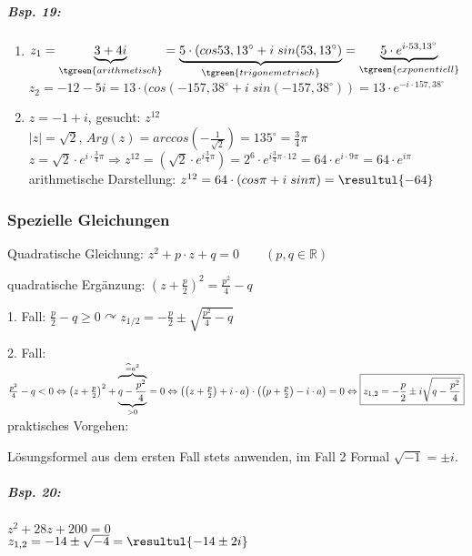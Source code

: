 \subparagraph{Bsp. 19:}
\begin{enumerate}
[label=\alph*.)]
\item $z_1=\underbrace{3+4i}_{\tgreen{arithmetisch}}=\underbrace{5\cdot (cos 53,13^{\circ}+i\; sin (53,13^{\circ})}_{\tgreen{trigonemetrisch}}=\underbrace{5\cdot e^{i\cdot 53,13^{\circ}}}_{\tgreen{exponentiell}}$\\
$z_2=-12-5i=13\cdot (cos(-157,38^{\circ}+i\; sin(-157,38^{\circ}))=13\cdot e^{-i\cdot 157,38^{\circ}}$
\item $z=-1+i$, gesucht: $z^{12}$\\
$|z|=\sqrt{2}$, $Arg(z)=arccos\left(-\frac{1}{\sqrt{2}}\right)=135^{\circ}=\frac{3}{4}\pi$\\
$z=\sqrt{2}\cdot e^{i\cdot \frac{3}{4}\pi}\Rightarrow z^12=\left(\sqrt{2}\cdot e^{i\frac{3}{4}\pi}\right)=2^6\cdot e^{i\frac{3}{4}\pi \cdot 12}=64 \cdot e ^{i\cdot 9 \pi}=64\cdot e^{i\pi}$\\
arithmetische Darstellung: $z^{12}=64\cdot (cos\pi+i\; sin\pi)=\resultul{-64}$
\end{enumerate}

\subsubsection{Spezielle Gleichungen}
Quadratische Gleichung: $z^2+p\cdot z+q=0 \qquad (p,q \in \mathbb{R})$

quadratische Ergänzung: $\left(z+\frac{p}{2}\right)^2=\frac{p^2}{4}-q$

1. Fall: $\frac{p}{2}-q \geq 0 \curvearrowright z_{1/2}=-\frac{p}{2}\pm \sqrt{\frac{p^2}{4}-q}$

2. Fall: $\frac{p^2}{4}-q < 0 \\
\Leftrightarrow \left(z+\frac{p}{2}\right)^2+\overbrace{\underbrace{q-\frac{p^2}{4}}_{>0}}^{\widehat=a^2}=0 \\
\Leftrightarrow \left(\left(z+\frac{p}{2}\right)+i\cdot a\right)\cdot \left(\left(p+\frac{p}{2}\right)-i\cdot a\right)=0\\
\Leftrightarrow \boxed{z_{1,2}=-\frac{p}{2}\pm i \sqrt{q-\frac{p^2}{4}}}$\\
praktisches Vorgehen:

Lösungsformel aus dem ersten Fall stets anwenden, im Fall 2 Formal $\sqrt{-1}=\pm i$.

\subparagraph{Bsp. 20:}\parskp
$z^2+28z+200=0$\\
$z_{1,2}=-14\pm \sqrt{-4}=\resultul{-14\pm 2i}$

